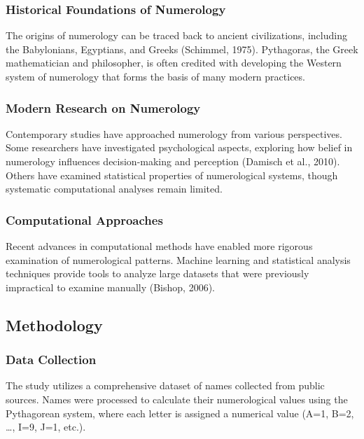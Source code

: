 \documentclass[
  american,
  11pt,
  oneside]{article}
\begin{document}
\subsubsection{Historical Foundations of
Numerology}\label{historical-foundations-of-numerology}

The origins of numerology can be traced back to ancient civilizations,
including the Babylonians, Egyptians, and Greeks (Schimmel, 1975).
Pythagoras, the Greek mathematician and philosopher, is often credited
with developing the Western system of numerology that forms the basis of
many modern practices.

\subsubsection{Modern Research on
Numerology}\label{modern-research-on-numerology}

Contemporary studies have approached numerology from various
perspectives. Some researchers have investigated psychological aspects,
exploring how belief in numerology influences decision-making and
perception (Damisch et al., 2010). Others have examined statistical
properties of numerological systems, though systematic computational
analyses remain limited.

\subsubsection{Computational Approaches}\label{computational-approaches}

Recent advances in computational methods have enabled more rigorous
examination of numerological patterns. Machine learning and statistical
analysis techniques provide tools to analyze large datasets that were
previously impractical to examine manually (Bishop, 2006).

\subsection{Methodology}\label{methodology}

\subsubsection{Data Collection}\label{data-collection}

The study utilizes a comprehensive dataset of names collected from
public sources. Names were processed to calculate their numerological
values using the Pythagorean system, where each letter is assigned a
numerical value (A=1, B=2, \ldots, I=9, J=1, etc.).
\end{document}
